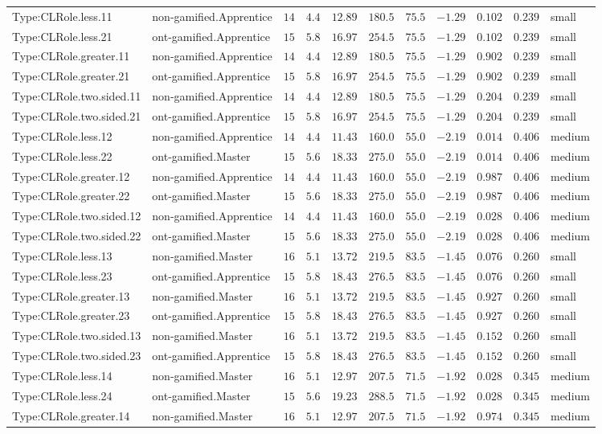 \documentclass[6pt,a4paper]{article}
\begin{document}
{\begin{longtable}{llrrrrrrrrl}
Type:CLRole.less.11&non-gamified.Apprentice&$14$&$4.4$&$12.89$&$ 180.5$&$ 75.5$&$-1.29$&$0.102$&$0.239$&small\tabularnewline
Type:CLRole.less.21&ont-gamified.Apprentice&$15$&$5.8$&$16.97$&$ 254.5$&$ 75.5$&$-1.29$&$0.102$&$0.239$&small\tabularnewline
Type:CLRole.greater.11&non-gamified.Apprentice&$14$&$4.4$&$12.89$&$ 180.5$&$ 75.5$&$-1.29$&$0.902$&$0.239$&small\tabularnewline
Type:CLRole.greater.21&ont-gamified.Apprentice&$15$&$5.8$&$16.97$&$ 254.5$&$ 75.5$&$-1.29$&$0.902$&$0.239$&small\tabularnewline
Type:CLRole.two.sided.11&non-gamified.Apprentice&$14$&$4.4$&$12.89$&$ 180.5$&$ 75.5$&$-1.29$&$0.204$&$0.239$&small\tabularnewline
Type:CLRole.two.sided.21&ont-gamified.Apprentice&$15$&$5.8$&$16.97$&$ 254.5$&$ 75.5$&$-1.29$&$0.204$&$0.239$&small\tabularnewline
Type:CLRole.less.12&non-gamified.Apprentice&$14$&$4.4$&$11.43$&$ 160.0$&$ 55.0$&$-2.19$&$0.014$&$0.406$&medium\tabularnewline
Type:CLRole.less.22&ont-gamified.Master&$15$&$5.6$&$18.33$&$ 275.0$&$ 55.0$&$-2.19$&$0.014$&$0.406$&medium\tabularnewline
Type:CLRole.greater.12&non-gamified.Apprentice&$14$&$4.4$&$11.43$&$ 160.0$&$ 55.0$&$-2.19$&$0.987$&$0.406$&medium\tabularnewline
Type:CLRole.greater.22&ont-gamified.Master&$15$&$5.6$&$18.33$&$ 275.0$&$ 55.0$&$-2.19$&$0.987$&$0.406$&medium\tabularnewline
Type:CLRole.two.sided.12&non-gamified.Apprentice&$14$&$4.4$&$11.43$&$ 160.0$&$ 55.0$&$-2.19$&$0.028$&$0.406$&medium\tabularnewline
Type:CLRole.two.sided.22&ont-gamified.Master&$15$&$5.6$&$18.33$&$ 275.0$&$ 55.0$&$-2.19$&$0.028$&$0.406$&medium\tabularnewline
Type:CLRole.less.13&non-gamified.Master&$16$&$5.1$&$13.72$&$ 219.5$&$ 83.5$&$-1.45$&$0.076$&$0.260$&small\tabularnewline
Type:CLRole.less.23&ont-gamified.Apprentice&$15$&$5.8$&$18.43$&$ 276.5$&$ 83.5$&$-1.45$&$0.076$&$0.260$&small\tabularnewline
Type:CLRole.greater.13&non-gamified.Master&$16$&$5.1$&$13.72$&$ 219.5$&$ 83.5$&$-1.45$&$0.927$&$0.260$&small\tabularnewline
Type:CLRole.greater.23&ont-gamified.Apprentice&$15$&$5.8$&$18.43$&$ 276.5$&$ 83.5$&$-1.45$&$0.927$&$0.260$&small\tabularnewline
Type:CLRole.two.sided.13&non-gamified.Master&$16$&$5.1$&$13.72$&$ 219.5$&$ 83.5$&$-1.45$&$0.152$&$0.260$&small\tabularnewline
Type:CLRole.two.sided.23&ont-gamified.Apprentice&$15$&$5.8$&$18.43$&$ 276.5$&$ 83.5$&$-1.45$&$0.152$&$0.260$&small\tabularnewline
Type:CLRole.less.14&non-gamified.Master&$16$&$5.1$&$12.97$&$ 207.5$&$ 71.5$&$-1.92$&$0.028$&$0.345$&medium\tabularnewline
Type:CLRole.less.24&ont-gamified.Master&$15$&$5.6$&$19.23$&$ 288.5$&$ 71.5$&$-1.92$&$0.028$&$0.345$&medium\tabularnewline
Type:CLRole.greater.14&non-gamified.Master&$16$&$5.1$&$12.97$&$ 207.5$&$ 71.5$&$-1.92$&$0.974$&$0.345$&medium\tabularnewline

\end{longtable}}
\end{document}
